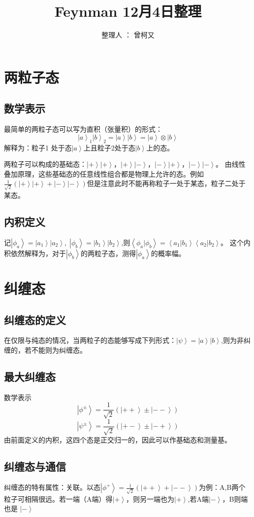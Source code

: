 \documentclass[10pt,a4paper,nocap]{ctexart}
\title{Feynman 12月4日整理}
\author{整理人 ：  曾柯又}
\date{\vspace{-5ex}}
\newcommand{\ket}[1]{\left|#1\right>}
\newcommand{\braket}[2]{\left<#1|#2\right>}
\begin{document}
\maketitle
\section{两粒子态}
\subsection{数学表示}
最简单的两粒子态可以写为直积（张量积）的形式：\[\left|a\right>_1\left|b\right>_2 = \left|a\right>\left|b\right> = \left|a\right>\otimes\left|b\right> \]
解释为：粒子1 处于态\(\left|a\right>\)上且粒子2处于态\(\left|b\right>\)上的态。

两粒子可以构成的基础态：\(\left|+\right>\left|+\right>，\left|+\right>\left|-\right>，\left|-\right>\left|+\right>，\left|-\right>\left|-\right>\)。
由线性叠加原理，这些基础态的任意线性组合都是物理上允许的态。例如\(\frac{1}{\sqrt{2}}(\left|+\right>\left|+\right> + \left|-\right>\left|-\right>)\)但是注意此时不能再称粒子一处于某态，粒子二处于某态。
\subsection{内积定义}
记\(\left|\phi_a\right> = \left|a_1\right>\left|a_2\right>,\;\left|\phi_b\right> = \ket{b_1}\ket{b_2}\),则\(\braket{\phi_a}{\phi_b} = \braket{a_1}{b_1}\braket{a_2}{b_2}\)。
这个内积依然解释为，对于\(\left|\phi_b\right>\)的两粒子态，测得\(\left|\phi_a\right>\)的概率幅。
\section{纠缠态}
\subsection{纠缠态的定义}
在仅限与纯态的情况，当两粒子的态能够写成下列形式：\(\ket{\psi} = \ket{a}\ket{b}\),则为非纠缠的，若不能则为纠缠态。
\subsection{最大纠缠态}
数学表示\[\ket{\phi^\pm} = \frac{1}{\sqrt{2}}(\ket{++} \pm \ket{--})\]
\[\ket{\psi^\pm} = \frac{1}{\sqrt{2}}(\ket{+-} \pm \ket{-+})\]
由前面定义的内积，这四个态是正交归一的，因此可以作基础态和测量基。\\
\subsection{纠缠态与通信}
纠缠态的特有属性：关联。以态\(\ket{\phi^+} = \frac{1}{\sqrt{2}}(\ket{++} + \ket{--})\)为例：A,B两个粒子可相隔很远。若一端（A端）得\(\ket{+}\)，则另一端也为\(\ket{+}\),若A端\(\ket{-}\)，B则端也是
\(\ket{-}\)
\end{document}
